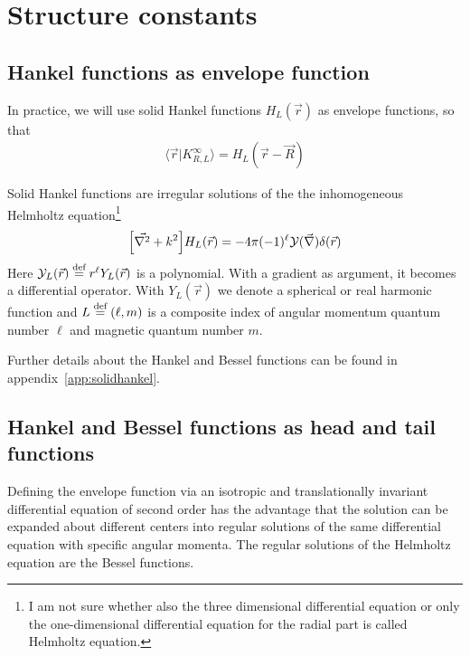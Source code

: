 \documentclass[11pt,a4paper]{report}
\begin{document}
\section{Structure constants}
\subsection{Hankel functions as envelope function}
In practice, we will use solid Hankel functions $H_L(\vec{r})$ as
envelope functions, so that 
\begin{eqnarray}
\langle\vec{r}|K^\infty_{R,L}\rangle= H_L(\vec{r}-\vec{R})
\end{eqnarray}

Solid Hankel functions are irregular solutions of the the
inhomogeneous Helmholtz equation\footnote{I am not sure whether also
  the three dimensional differential equation or only the
  one-dimensional differential equation for the radial part is called
  Helmholtz equation.}
\begin{eqnarray}
\Bigl[\vec{\nabla^2}+k^2\Bigr]H_{L}(\vec{r})
=-4\pi(-1)^\ell\mathcal{Y}(\vec{\nabla})\delta(\vec{r})
\label{eq:solidhelmholtzequation}
\end{eqnarray}
Here $\mathcal{Y}_L(\vec{r})\stackrel{\text{def}}{=} r^\ell Y_L(\vec{r})$ is a
polynomial. With a gradient as argument, it becomes a differential
operator. With $Y_L(\vec{r})$ we denote a spherical or real harmonic
function and $L\stackrel{\text{def}}{=}(\ell,m)$ is a composite index of angular
momentum quantum number $\ell$ and magnetic quantum number $m$.

Further details about the Hankel and Bessel functions can be found in
appendix~\ref{app:solidhankel}.

\subsection{Hankel and Bessel functions as head and tail functions}
Defining the envelope function via an isotropic and translationally
invariant differential equation of second order has the advantage
that the solution can be expanded about different centers into regular
solutions of the same differential equation with specific angular
momenta. The regular solutions of the Helmholtz equation are the
Bessel functions.
\end{document}
